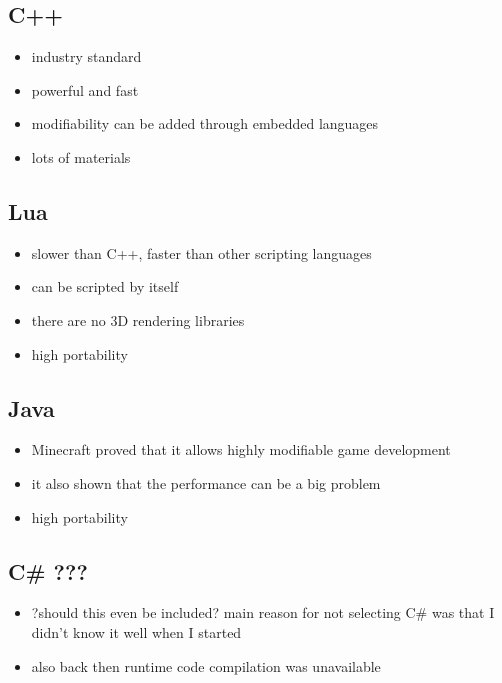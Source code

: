 \subsection{C++}

\begin{itemize}
    \item industry standard
    \item powerful and fast
    \item modifiability can be added through embedded languages
    \item lots of materials
\end{itemize}

\subsection{Lua}

\begin{itemize}
    \item slower than C++, faster than other scripting languages
    \item can be scripted by itself
    \item there are no 3D rendering libraries
    \item high portability
\end{itemize}

\subsection{Java}

\begin{itemize}
    \item Minecraft proved that it allows highly modifiable game
        development
    \item it also shown that the performance can be a big problem
    \item high portability
\end{itemize}

\subsection{C\# ???}

\begin{itemize}
    \item ?should this even be included? main reason for not selecting
        C\# was that I didn't know it well when I started
    \item also back then runtime code compilation was unavailable
\end{itemize}

